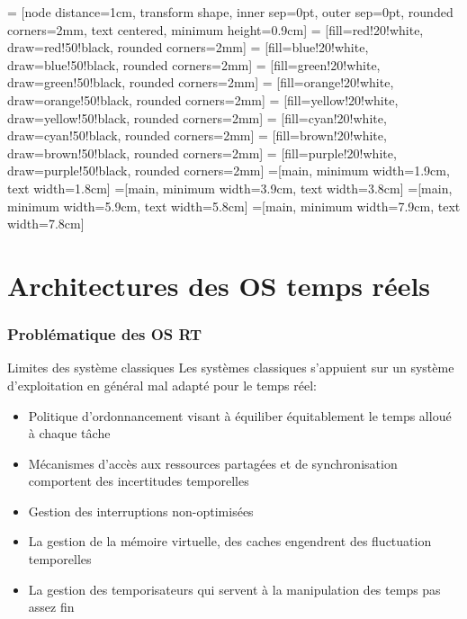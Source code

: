 % 
%
%


     = [node distance=1cm, transform shape, inner sep=0pt, outer sep=0pt, rounded corners=2mm, text centered, minimum height=0.9cm]
     = [fill=red!20!white,     draw=red!50!black,     rounded corners=2mm]
    = [fill=blue!20!white,    draw=blue!50!black,    rounded corners=2mm]
   = [fill=green!20!white,   draw=green!50!black,   rounded corners=2mm]
  = [fill=orange!20!white,  draw=orange!50!black,  rounded corners=2mm]
  = [fill=yellow!20!white,  draw=yellow!50!black,  rounded corners=2mm]
    = [fill=cyan!20!white,    draw=cyan!50!black,    rounded corners=2mm]
   = [fill=brown!20!white,   draw=brown!50!black,   rounded corners=2mm]
  = [fill=purple!20!white,  draw=purple!50!black,  rounded corners=2mm]
=[main, minimum width=1.9cm, text width=1.8cm]
=[main, minimum width=3.9cm, text width=3.8cm]
=[main, minimum width=5.9cm, text width=5.8cm]
=[main, minimum width=7.9cm, text width=7.8cm]

\part{Architectures des OS temps réels}

\section{Problématique des OS RT} %

\begin{frame}{Limites des système classiques}
  Les systèmes classiques s'appuient sur un système d'exploitation en général mal adapté pour le temps réel:
  \begin{itemize}
  \item Politique d'ordonnancement visant à équiliber équitablement le temps alloué à chaque tâche
  \item Mécanismes d'accès aux ressources partagées et de synchronisation comportent des incertitudes temporelles
  \item Gestion des interruptions non-optimisées
  \item La gestion de la mémoire virtuelle, des caches engendrent des fluctuation temporelles
  \item La gestion des temporisateurs qui servent à la manipulation des temps pas assez fin
  \end{itemize} 
\end{frame}

